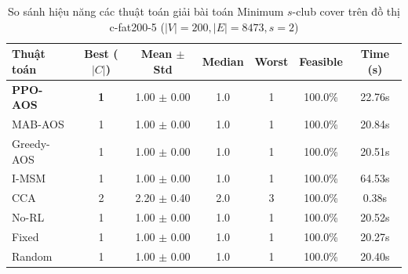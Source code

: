 \begin{table}[htbp]
\centering
\caption{So sánh hiệu năng các thuật toán giải bài toán Minimum $s$-club cover trên đồ thị c-fat200-5 ($|V|=200, |E|=8473, s=2$)}
\label{tab:results_c_fat200_5}
\begin{tabular}{lcccccc}
\hline
\textbf{Thuật toán} & \textbf{Best ($|C|$)} & \textbf{Mean $\pm$ Std} & \textbf{Median} & \textbf{Worst} & \textbf{Feasible} & \textbf{Time (s)} \\
\hline
\textbf{PPO-AOS} & \textbf{1} & 1.00 $\pm$ 0.00 & 1.0 & 1 & 100.0\% & 22.76s \\
MAB-AOS & 1 & 1.00 $\pm$ 0.00 & 1.0 & 1 & 100.0\% & 20.84s \\
Greedy-AOS & 1 & 1.00 $\pm$ 0.00 & 1.0 & 1 & 100.0\% & 20.51s \\
I-MSM & 1 & 1.00 $\pm$ 0.00 & 1.0 & 1 & 100.0\% & 64.53s \\
CCA & 2 & 2.20 $\pm$ 0.40 & 2.0 & 3 & 100.0\% & 0.38s \\
No-RL & 1 & 1.00 $\pm$ 0.00 & 1.0 & 1 & 100.0\% & 20.52s \\
Fixed & 1 & 1.00 $\pm$ 0.00 & 1.0 & 1 & 100.0\% & 20.27s \\
Random & 1 & 1.00 $\pm$ 0.00 & 1.0 & 1 & 100.0\% & 20.40s \\
\hline
\end{tabular}
\end{table}
